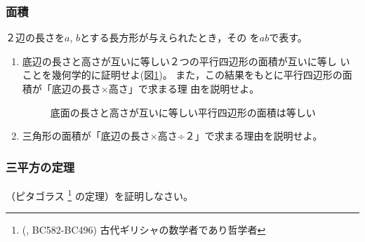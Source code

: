 \documentclass[twocolumn,11pt]{jarticle}
\begin{document}
\subsubsection{面積}
２辺の長さを$a$, $b$とする長方形が与えられたとき，その
を$ab$で表す。
\begin{enumerate}
\item 底辺の長さと高さが互いに等しい２つの平行四辺形の面積が互いに等し
  いことを幾何学的に証明せよ(図\ref{fig:parallelogram})。
  また，この結果をもとに平行四辺形の面積が「底辺の長さ×高さ」で求まる理
  由を説明せよ。
\begin{figure}[t]
  \begin{center}
    \caption{底面の長さと高さが互いに等しい平行四辺形の面積は等しい}
    \label{fig:parallelogram}
  \end{center}
\end{figure}
\item 三角形の面積が「底辺の長さ×高さ÷２」で求まる理由を説明せよ。
\end{enumerate}

\subsubsection{三平方の定理}
（ピタゴラス
\footnote{(, BC582-BC496)
  古代ギリシャの数学者であり哲学者} 
の定理）を証明しなさい。
\end{document}
